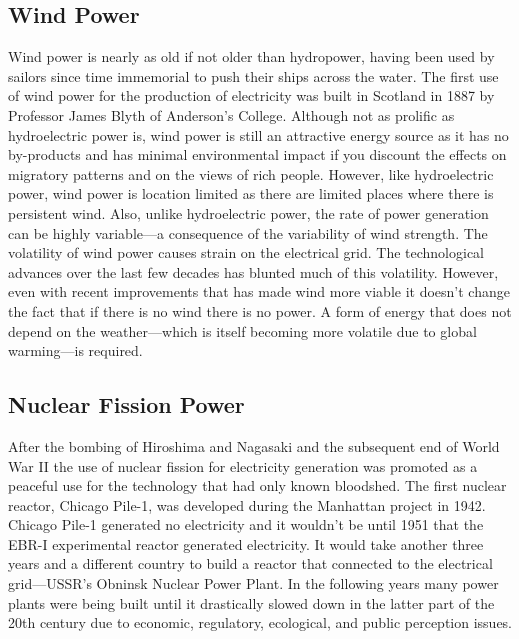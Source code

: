 \subsection{Wind Power}
Wind power is nearly as old if not older than hydropower, having been used by sailors since time immemorial to push their ships across the water. The first use of wind power for the production of electricity was built in Scotland in 1887 by Professor James Blyth of Anderson's College\cite{price2005james}. Although not as prolific as hydroelectric power is, wind power is still an attractive energy source as it has no by-products and has minimal environmental impact if you discount the effects on migratory patterns and on the views of rich people\cite{cape_cod_wind}. However, like hydroelectric power, wind power is location limited as there are limited places where there is persistent wind. Also, unlike hydroelectric power, the rate of power generation can be highly variable---a consequence of the variability of wind strength. The volatility of wind power causes strain on the electrical grid. The technological advances over the last few decades has blunted much of this volatility. However, even with recent improvements that has made wind more viable it doesn't change the fact that if there is no wind there is no power. A form of energy that does not depend on the weather---which is itself becoming more volatile due to global warming---is required.

\subsection{Nuclear Fission Power}
After the bombing of Hiroshima and Nagasaki and the subsequent end of World War II the use of nuclear fission for electricity generation was promoted as a peaceful use for the technology that had only known bloodshed. The first nuclear reactor, Chicago Pile-1, was developed during the Manhattan project in 1942. Chicago Pile-1 generated no electricity and it wouldn't be until 1951 that the EBR-I experimental reactor generated electricity\cite{doe_nuclearhistory}. It would take another three years and a different country to build a reactor that connected to the electrical grid---USSR's Obninsk Nuclear Power Plant. In the following years many power plants were being built until it drastically slowed down in the latter part of the 20th century due to economic, regulatory, ecological, and public perception issues.

